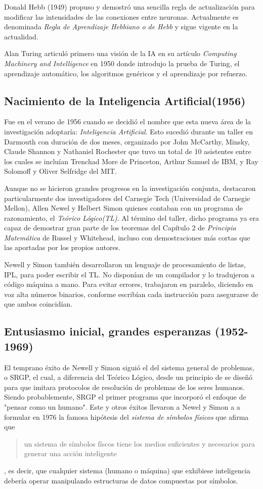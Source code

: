 \documentclass[12pt,a4paper]{article}
\begin{document}
Donald Hebb (1949) propuso y demostró una sencilla regla de actualización para modificar las intensidades de las conexiones entre neuronas. Actualmente es denominada \emph{Regla de Aprendizaje Hebbiano o de Hebb} y sigue vigente en la actualidad.

Alan Turing articuló primero una visión de la IA en su artículo \emph{Computing Machinery and Intelligence} en 1950 donde introdujo la prueba de Turing, el aprendizaje automático, los algoritmos genéricos y el aprendizaje por refuerzo.

\subsection{Nacimiento de la Inteligencia Artificial(1956)}
Fue en el verano de 1956 cuando se decidió el nombre que esta nueva área de la investigación adoptaría: \emph{Inteligencia Artificial}. Esto sucedió durante un taller en Darmouth con duración de dos meses, organizado por John McCarthy, Minsky, Claude Shannon y Nathaniel Rochester que tuvo un total de 10 asistentes entre los cuales se incluían Trenchad More de Princeton, Arthur Samuel de IBM, y Ray Solomoff y Oliver Selfridge del MIT.

Aunque no se hicieron grandes progresos en la investigación conjunta, destacaron particularmente dos investigadores del Carnegie Tech (Universidad de Carnegie Mellon), Allen Newel y Helbert Simon quienes contaban con un programa de razonamiento, el \emph{Teórico Lógico(TL)}. Al término del taller, dicho programa ya era capaz de demostrar gran parte de los teoremas del Capítulo 2 de \emph{Principia Matemática} de Russel y Whitehead, incluso con demostraciones más cortas que las aportadas por los propios autores.

Newell y Simon también desarrollaron un lenguaje de procesamiento de listas, IPL, para poder escribir el TL. No disponían de un compilador y lo tradujeron a código máquina a mano. Para evitar errores, trabajaron en paralelo, diciendo en voz alta números binarios, conforme escribían cada instrucción para asegurarse de que ambos coincidían.

\subsection{Entusiasmo inicial, grandes esperanzas (1952-1969)}
El temprano éxito de Newell y Simon siguió el del sistema general de problemas, o SRGP, el cual, a diferencia del Teórico Lógico, desde un principio de se diseñó para que imitara protocolos de resolución de problemas de los seres humanos. Siendo probablemente, SRGP el primer programa que incorporó el enfoque de "pensar como un humano". Este y otros éxitos llevaron a Newel y Simon a a formular en 1976 la famosa hipótesis del \emph{sistema de símbolos físicos} que afirma que \begin{quote}\small un sistema de símbolos físcos tiene los medios suficientes y necesarios para generar una acción inteligente\end{quote}, es decir, que cualquier sistema (humano o máquina) que exhibiese inteligencia debería operar manipulando estructuras de datos compuestas por símbolos.
\end{document}
